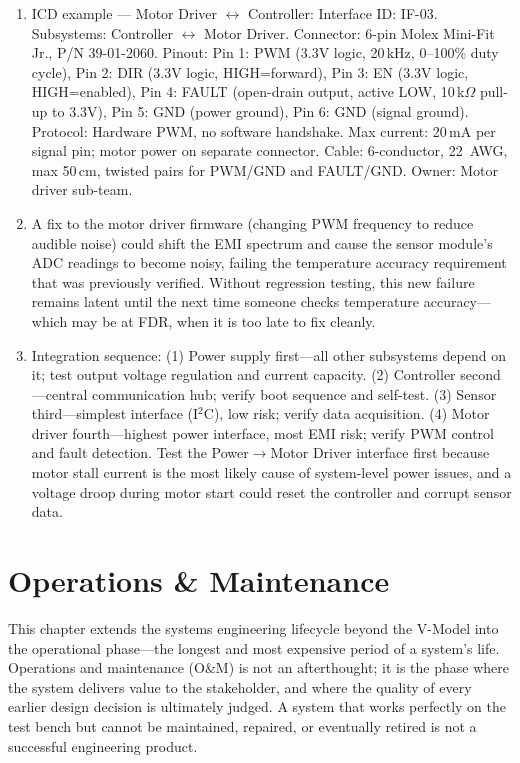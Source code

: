 \documentclass[11pt,letterpaper,twoside,openany]{book}
\begin{document}
\begin{enumerate}[leftmargin=1.5em]
\item ICD example --- Motor Driver $\leftrightarrow$ Controller: Interface ID: IF-03. Subsystems: Controller $\leftrightarrow$ Motor Driver. Connector: 6-pin Molex Mini-Fit Jr., P/N 39-01-2060. Pinout: Pin 1: PWM (3.3V logic, 20\,kHz, 0--100\% duty cycle), Pin 2: DIR (3.3V logic, HIGH=forward), Pin 3: EN (3.3V logic, HIGH=enabled), Pin 4: FAULT (open-drain output, active LOW, 10\,k$\Omega$ pull-up to 3.3V), Pin 5: GND (power ground), Pin 6: GND (signal ground). Protocol: Hardware PWM, no software handshake. Max current: 20\,mA per signal pin; motor power on separate connector. Cable: 6-conductor, 22~AWG, max 50\,cm, twisted pairs for PWM/GND and FAULT/GND. Owner: Motor driver sub-team.

\item A fix to the motor driver firmware (changing PWM frequency to reduce audible noise) could shift the EMI spectrum and cause the sensor module's ADC readings to become noisy, failing the temperature accuracy requirement that was previously verified. Without regression testing, this new failure remains latent until the next time someone checks temperature accuracy---which may be at FDR, when it is too late to fix cleanly.

\item Integration sequence: (1) Power supply first---all other subsystems depend on it; test output voltage regulation and current capacity. (2) Controller second---central communication hub; verify boot sequence and self-test. (3) Sensor third---simplest interface (I$^2$C), low risk; verify data acquisition. (4) Motor driver fourth---highest power interface, most EMI risk; verify PWM control and fault detection. Test the Power$\to$Motor Driver interface first because motor stall current is the most likely cause of system-level power issues, and a voltage droop during motor start could reset the controller and corrupt sensor data.
\end{enumerate}

\FloatBarrier
\chapter{Operations \& Maintenance}

\vspace{1em}

This chapter extends the systems engineering lifecycle beyond the V-Model into the operational phase---the longest and most expensive period of a system's life. Operations and maintenance (O\&M) is not an afterthought; it is the phase where the system delivers value to the stakeholder, and where the quality of every earlier design decision is ultimately judged. A system that works perfectly on the test bench but cannot be maintained, repaired, or eventually retired is not a successful engineering product.
\end{document}
